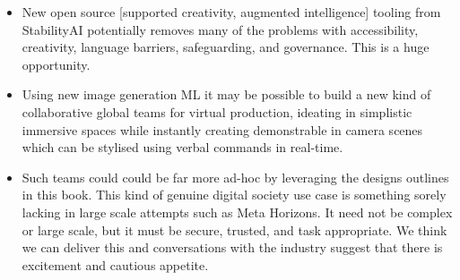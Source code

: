 \begin{itemize}
\item New open source [supported creativity, augmented intelligence] tooling from StabilityAI potentially removes many of the problems with accessibility, creativity, language barriers, safeguarding, and governance. This is a huge opportunity.
\item Using new image generation ML it may be possible to build a new kind of collaborative global teams for virtual production, ideating in simplistic immersive spaces while instantly creating demonstrable in camera scenes which can be stylised using verbal commands in real-time.
\item Such teams could could be far more ad-hoc by leveraging the designs outlines in this book. This kind of genuine digital society use case is something sorely lacking in large scale attempts such as Meta Horizons. It need not be complex or large scale, but it must be secure, trusted, and task appropriate. We think we can deliver this and conversations with the industry suggest that there is excitement and cautious appetite. 
\end{itemize}


